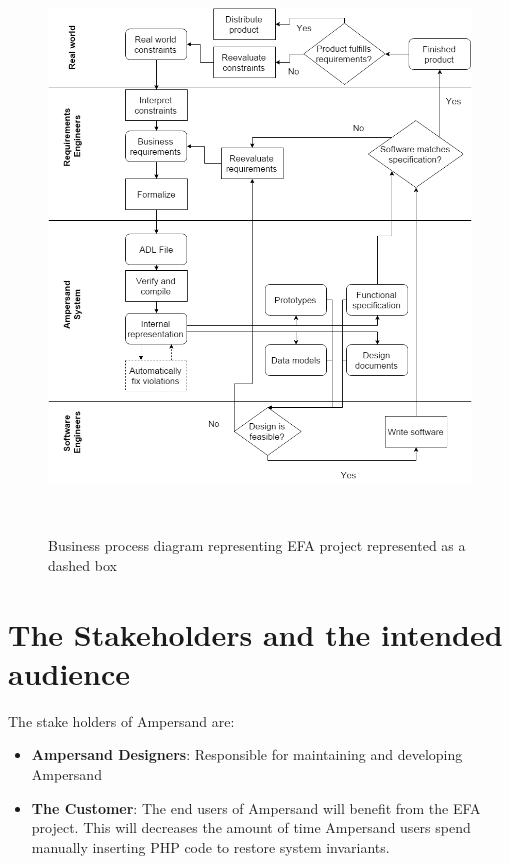 \begin{figure}[!htb]
\begin{center}
\includegraphics[width=\textwidth]{../figures/business_process}
\caption{Business process diagram representing EFA project represented as a dashed box}~\label{fig:EFAproject}
\end{center}
\end{figure}

 \section{The Stakeholders and the intended audience}\label{sec:Stakeholders}
The stake holders of Ampersand are:

\begin{itemize}
	\item \textbf{Ampersand Designers}: Responsible for maintaining and developing Ampersand
	\item \textbf{The Customer}: The end users of Ampersand will benefit from the EFA project. This will decreases the amount of time 
Ampersand users spend manually inserting PHP code to restore system invariants. 
\end{itemize}

